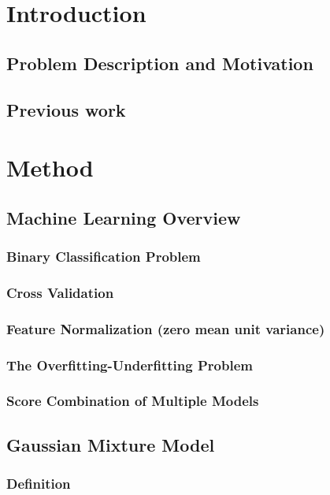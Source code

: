 \documentclass[11pt,a4paper]{tesis}
\begin{document}
\linespread{1.6}
\tableofcontents
\chapter{Introduction}
	\section{Problem Description and Motivation}
	\section{Previous work}
		
\chapter{Method}
	\section{Machine Learning Overview}
		\subsection{Binary Classification Problem}
			
		\subsection{Cross Validation}
		\subsection{Feature Normalization (zero mean unit variance)}
			
		\subsection{The Overfitting-Underfitting Problem}
		\subsection{Score Combination of Multiple Models}
	\section{Gaussian Mixture Model}
		\subsection{Definition}
\end{document}
